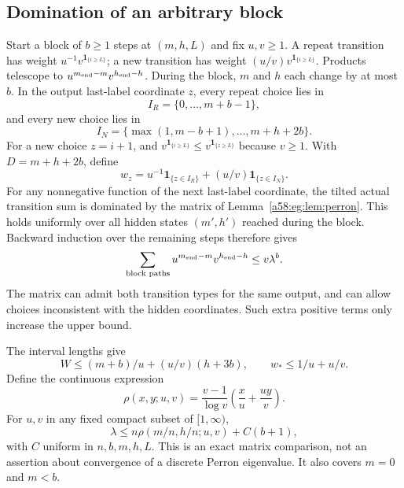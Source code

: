\documentclass[11pt,letterpaper]{article}
\theoremstyle{remark}
\newcommand{\ind}[1]{\mathbf1_{\{#1\}}}
\begin{document}
\subsection{Domination of an arbitrary block}
Start a block of $b\ge1$ steps at $(m,h,L)$ and fix $u,v\ge1$. A repeat transition has weight $u^{-1}v^{\ind{i\ge L}}$; a new transition has weight $(u/v)v^{\ind{i\ge L}}$. Products telescope to
$u^{m_{\rm end}-m}v^{h_{\rm end}-h}$.
During the block, $m$ and $h$ each change by at most $b$.
In the output last-label coordinate $z$, every repeat choice lies in
\[
 I_R=\{0,\ldots,m+b-1\},
\]
and every new choice lies in
\[
 I_N=\{\max(1,m-b+1),\ldots,m+h+2b\}.
\]
For a new choice $z=i+1$, and $v^{\ind{i\ge L}}\le v^{\ind{z\ge L}}$ because $v\ge1$. With $D=m+h+2b$, define
\[
 w_z=u^{-1}\ind{z\in I_R}+(u/v)\ind{z\in I_N}.
\]
For any nonnegative function of the next last-label coordinate, the tilted actual transition sum is dominated by the matrix of Lemma~\ref{a58:eg:lem:perron}. This holds uniformly over all hidden states $(m',h')$ reached during the block. Backward induction over the remaining steps therefore gives
\begin{equation}\label{a58:eg:eq:blocktilt}
 \sum_{\text{block paths}}u^{m_{\rm end}-m}v^{h_{\rm end}-h}
 \le v\lambda^b.
\end{equation}
The matrix can admit both transition types for the same output, and can allow choices inconsistent with the hidden coordinates. Such extra positive terms only increase the upper bound.

The interval lengths give
\[
 W\le(m+b)/u+(u/v)(h+3b),\qquad w_*\le1/u+u/v.
\]
Define the continuous expression
\begin{equation}\label{a58:eg:eq:rho}
 \rho(x,y;u,v)=\frac{v-1}{\log v}\left(\frac xu+\frac{uy}v\right).
\end{equation}
For $u,v$ in any fixed compact subset of $[1,\infty)$,
\begin{equation}\label{a58:eg:eq:lambdauniform}
 \lambda\le n\rho(m/n,h/n;u,v)+C(b+1),
\end{equation}
with $C$ uniform in $n,b,m,h,L$. This is an exact matrix comparison, not an assertion about convergence of a discrete Perron eigenvalue. It also covers $m=0$ and $m<b$.
\end{document}
